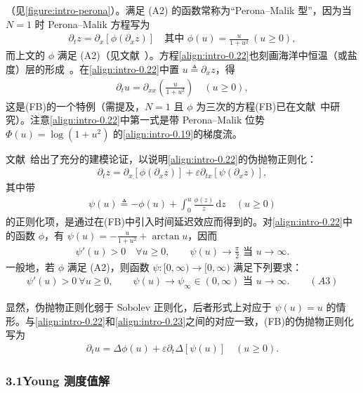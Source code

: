 \documentclass[../main.tex]{subfiles}
\begin{document}
（见\cref{figure:intro-perona}）。满足 (A2) 的函数常称为“Perona--Malik 型”，因为当 $N=1$ 时 Perona--Malik 方程写为
\begin{align}
\partial_t z = \partial_x[\phi(\partial_x z)] \quad \text{其中 }\phi(u)=\frac{u}{1+u^2}\ (u\geqslant0), \label{align:intro-0.22}
\end{align}
而上文的 $\phi$ 满足 (A2)（见文献~\cite{ref79}）。方程\eqref{align:intro-0.22}也刻画海洋中恒温（或盐度）层的形成~\cite{ref11}。在\eqref{align:intro-0.22}中置 $u\triangleq \partial_x z$，得
\begin{align}
\partial_t u = \partial_{xx}\left(\frac{u}{1+u^2}\right) \quad (u\geqslant0), \label{align:intro-0.23}
\end{align}
这是(FB)的一个特例（需提及，$N=1$ 且 $\phi$ 为三次的方程(FB)已在文献~\cite{ref77}中研究）。注意\eqref{align:intro-0.22}中第一式是带 Perona--Malik 位势 $\Phi(u)=\log(1+u^2)$ 的\eqref{align:intro-0.19}的梯度流。

文献~\cite{ref11}给出了充分的建模论证，以说明\eqref{align:intro-0.22}的伪抛物正则化：
\begin{align*}
\partial_t z = \partial_x[\phi(\partial_x z)] + \varepsilon\partial_{tx}[\psi(\partial_x z)],
\end{align*}
其中带
\begin{align}
\psi(u) \triangleq  -\phi(u) + \int_0^u\frac{\phi(z)}{z}\,\mathrm{d}z \quad (u\geqslant0) \label{align:intro-0.24}
\end{align}
的正则化项，是通过在(FB)中引入时间延迟效应而得到的。对\eqref{align:intro-0.22}中的函数 $\phi$，有 $\psi(u)=-\frac{u}{1+u^2}+\arctan u$，因而
\begin{align*}
\psi'(u)>0 \quad \forall u\geqslant0, \qquad \psi(u)\to\frac{\pi}{2}\text{ 当 }u\to\infty.
\end{align*}
一般地，若 $\phi$ 满足 (A2)，则函数 $\psi:[0,\infty)\to[0,\infty)$ 满足下列要求：
\begin{align*}
\psi'(u)>0\ \forall u\geqslant0, \qquad \psi(u)\to\psi_\infty\in(0,\infty)\text{ 当 }u\to\infty. \qquad(A3)
\end{align*}

显然，伪抛物正则化弱于 Sobolev 正则化，后者形式上对应于 $\psi(u)=u$ 的情形。与\eqref{align:intro-0.22}和\eqref{align:intro-0.23}之间的对应一致，(FB)的伪抛物正则化写为
\begin{align*}
\partial_t u = \Delta\phi(u) + \varepsilon\partial_t\Delta[\psi(u)] \quad (u\geqslant0).
\end{align*}

\subsubsection*{3.1\quad Young 测度值解}\label{subsubsection:intro-youngfb}
\end{document}
